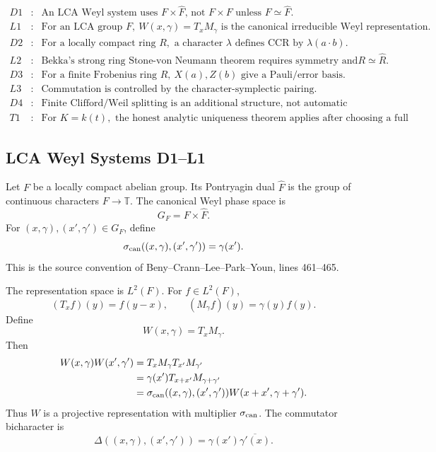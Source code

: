 \[
\begin{array}{rcl}
D1&:&\text{An LCA Weyl system uses }F\times\widehat F\text{, not }F\times F
      \text{ unless }F\simeq\widehat F.\\
L1&:&\text{For an LCA group }F,\ W(x,\gamma)=T_xM_\gamma
      \text{ is the canonical irreducible Weyl representation.}\\
D2&:&\text{For a locally compact ring }R,\text{ a character }\lambda
      \text{ defines CCR by }\lambda(a\cdot b).\\
L2&:&\text{Bekka's strong ring Stone-von Neumann theorem requires
      symmetry and }R\simeq\widehat R.\\
D3&:&\text{For a finite Frobenius ring }R,\ X(a),Z(b)\text{ give a
      Pauli/error basis.}\\
L3&:&\text{Commutation is controlled by the character-symplectic pairing.}\\
D4&:&\text{Finite Clifford/Weil splitting is an additional structure,
      not automatic from the Pauli basis.}\\
T1&:&\text{For }K=k(t),\text{ the honest analytic uniqueness theorem
      applies after choosing a full LCA phase space.}
\end{array}
\]

\subsection{LCA Weyl Systems D1--L1}

Let \(F\) be a locally compact abelian group.  Its Pontryagin dual
\(\widehat F\) is the group of continuous characters \(F\to \mathbb T\).  The
canonical Weyl phase space is
\[
  G_F=F\times\widehat F.
\]
For \((x,\gamma),(x',\gamma')\in G_F\), define
\[
  \sigma_{\rm can}((x,\gamma),(x',\gamma'))=\gamma(x').
\]
This is the source convention of Beny--Crann--Lee--Park--Youn, lines
461--465.

The representation space is \(L^2(F)\).  For \(f\in L^2(F)\),
\[
  (T_xf)(y)=f(y-x),\qquad (M_\gamma f)(y)=\gamma(y)f(y).
\]
Define
\[
  W(x,\gamma)=T_xM_\gamma .
\]
Then
\[
\begin{aligned}
  W(x,\gamma)W(x',\gamma')
  &=T_xM_\gamma T_{x'}M_{\gamma'}                       \\
  &=\gamma(x')T_{x+x'}M_{\gamma+\gamma'}                 \\
  &=\sigma_{\rm can}((x,\gamma),(x',\gamma'))W(x+x',
    \gamma+\gamma').
\end{aligned}
\]
Thus \(W\) is a projective representation with multiplier
\(\sigma_{\rm can}\).  The commutator bicharacter is
\[
  \Delta((x,\gamma),(x',\gamma'))
  =\gamma(x')\overline{\gamma'(x)}.
\]

